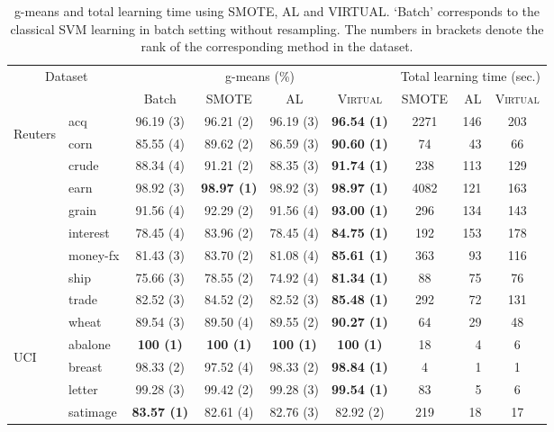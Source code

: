 \begin{table}[!tp]\centering \small
\caption{g-means and total learning time using SMOTE, AL and VIRTUAL.
`Batch' corresponds to the classical SVM learning in batch setting without resampling.
The numbers in brackets denote the rank of the corresponding method in the dataset.}
\begin{tabular}{l|l|c@{\hspace{1mm}}|c@{\hspace{1mm}}|c@{\hspace{1mm}}|c@{\hspace{1mm}}|c|r|c}
\hline
\multicolumn{2}{c|}{\multirow{2}{1cm}{Dataset}}&\multicolumn{4}{c|}{g-means (\%)}&\multicolumn{3}{c}{Total learning time (sec.)}\\\cline{3-9}
\multicolumn{2}{c|}{}&Batch&SMOTE&AL&\textsc{Virtual}&SMOTE&AL&\textsc{Virtual}\\
\hline\hline
\multirow{10}{3mm}{\begin{sideways}\parbox{13mm}{Reuters}\end{sideways}}
&acq&96.19 (3)&96.21 (2)&96.19 (3)&\textbf{96.54 (1)}&2271&146&203\\
&corn&85.55 (4)&89.62 (2)&86.59 (3)&\textbf{90.60 (1)}&74&43&66\\
&crude&88.34 (4)&91.21 (2)&88.35 (3)&\textbf{91.74 (1)}&238&113&129\\
&earn&98.92 (3)&\textbf{98.97 (1)}&98.92 (3)&\textbf{98.97 (1)}&4082&121&163\\
&grain&91.56 (4)&92.29 (2)&91.56 (4)&\textbf{93.00 (1)}&296&134&143\\
&interest&78.45 (4)&83.96 (2)&78.45 (4)&\textbf{84.75 (1)}&192&153&178\\
&money-fx&81.43 (3)&83.70 (2)&81.08 (4)&\textbf{85.61 (1)}&363&93&116\\
&ship&75.66 (3)&78.55 (2)&74.92 (4)&\textbf{81.34 (1)}&88&75&76\\
&trade&82.52 (3)&84.52 (2)&82.52 (3)&\textbf{85.48 (1)}&292&72&131\\
&wheat&89.54 (3)&89.50 (4)&89.55 (2)&\textbf{90.27 (1)}&64&29&48\\
\hline\hline
\multirow{4}{2mm}{\begin{sideways}\parbox{5mm}{UCI}\end{sideways}}
&abalone&\textbf{100 (1)}&\textbf{100 (1)}&\textbf{100 (1)}&\textbf{100 (1)}&18&4&6\\
&breast&98.33 (2)&97.52 (4)&98.33 (2)&\textbf{98.84 (1)}&4&1&1\\
&letter&99.28 (3)&99.42 (2)&99.28 (3)&\textbf{99.54 (1)}&83&5&6\\
&satimage&\textbf{83.57 (1)}&82.61 (4)&82.76 (3)&82.92 (2)&219&18&17\\
\hline
\end{tabular}
\vspace{-3mm}
\label{tbl:res_all}
\end{table}

